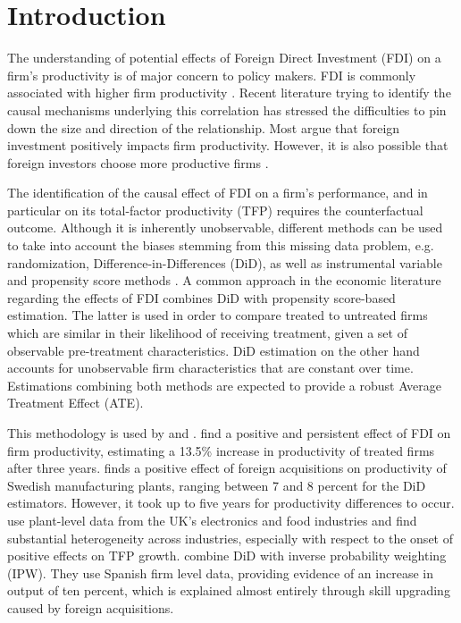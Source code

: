 \documentclass[a4paper,11pt]{scrartcl}
\begin{document}
\section{Introduction}

The understanding of potential effects of Foreign Direct Investment (FDI) on a firm's productivity is of major concern to policy makers. FDI is commonly associated with higher firm productivity \citep{girma2007}. 
Recent literature trying to identify the causal mechanisms underlying this correlation has stressed the difficulties to pin down the size and direction of the relationship. Most argue that foreign investment positively impacts firm productivity. However, it is also possible that foreign investors choose more productive firms \citep{arnold2009}.

The identification of the causal effect of FDI on a firm’s performance, and 
in particular on its total-factor productivity (TFP) requires the counterfactual outcome. Although it is inherently unobservable, different methods can be used to take into account the biases stemming from this missing data problem, e.g. randomization, Difference-in-Differences (DiD), as well as instrumental variable and propensity score methods \citep{karpaty2007}. A common approach in the economic literature regarding the effects of FDI combines DiD with propensity score-based estimation. The latter is used in order to compare treated to untreated firms which are similar in their likelihood of receiving treatment, given a set of observable pre-treatment characteristics. 
DiD estimation on the other hand accounts for unobservable firm characteristics that are constant over time. Estimations combining both methods are expected to provide a robust Average Treatment Effect (ATE). 

This methodology is used by \citet{arnold2009, karpaty2007, girma2007} and \citet{schiffbauer2017}. \citet{arnold2009}  find a positive and persistent effect of FDI on firm productivity, estimating a 13.5\% increase in productivity of treated firms after three years. \citet{karpaty2007} finds a positive effect of foreign acquisitions on productivity of Swedish manufacturing plants, ranging between 7 and 8 percent for the DiD estimators. However, it took up to five years for productivity differences to occur. 
\citet{girma2007} use plant-level data from the UK's electronics and food industries and find substantial heterogeneity across industries, especially with respect to the onset of positive effects on TFP growth.  \citet{koch2019} combine DiD with inverse probability weighting (IPW). They use Spanish firm level data, providing evidence of an increase in output of ten percent, which is explained almost entirely through skill upgrading caused by foreign acquisitions. 
\end{document}
